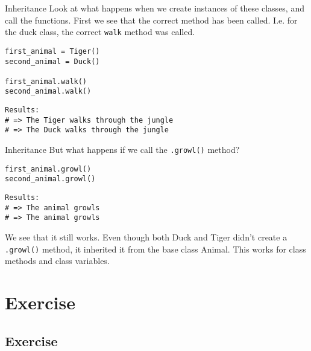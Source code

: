 \documentclass[10pt]{beamer}
\begin{document}
\begin{frame}[label={sec:org372ba81},fragile]{Inheritance}
 Look at what happens when we create instances of these classes, and call the
functions. First we see that the correct method has been called. I.e. for the duck
class, the correct \texttt{walk} method was called.

\begin{verbatim}
first_animal = Tiger()
second_animal = Duck()

first_animal.walk()
second_animal.walk()
\end{verbatim}

\begin{verbatim}
Results: 
# => The Tiger walks through the jungle
# => The Duck walks through the jungle
\end{verbatim}
\end{frame}

\begin{frame}[label={sec:org2fabbe0},fragile]{Inheritance}
 But what happens if we call the \texttt{.growl()} method?

\begin{verbatim}
first_animal.growl()
second_animal.growl()
\end{verbatim}

\begin{verbatim}
Results: 
# => The animal growls
# => The animal growls
\end{verbatim}


We see that it still works. Even though both Duck and Tiger didn't create a \texttt{.growl()}
method, it inherited it from the base class Animal. This works for class methods and
class variables.
\end{frame}

\section{Exercise}
\label{sec:org7c01ad5}

\subsection{Exercise}
\label{sec:orgce09ccb}
\end{document}
